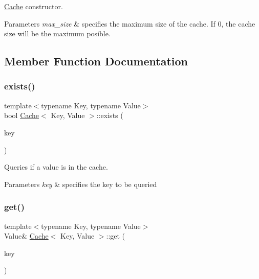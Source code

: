 \hyperlink{classCache}{Cache} constructor. 


\begin{DoxyParams}{Parameters}
{\em max\+\_\+size} & specifies the maximum size of the cache. If 0, the cache size will be the maximum posible. \\
\hline
\end{DoxyParams}


\subsection{Member Function Documentation}
\mbox{\label{classCache_a3cbee30a98148ba6e15e28e4e096d995}} 
\subsubsection{\texorpdfstring{exists()}{exists()}}
{\footnotesize\ttfamily template$<$typename Key, typename Value$>$ \\
bool \hyperlink{classCache}{Cache}$<$ Key, Value $>$\+::exists (\begin{DoxyParamCaption}\item[{const Key \&}]{key }\end{DoxyParamCaption})\hspace{0.3cm}{\ttfamily [inline]}}



Queries if a value is in the cache. 


\begin{DoxyParams}{Parameters}
{\em key} & specifies the key to be queried \\
\hline
\end{DoxyParams}
\mbox{\label{classCache_ae2c5a764bec9cf7bcc455d37377ff477}} 
\subsubsection{\texorpdfstring{get()}{get()}}
{\footnotesize\ttfamily template$<$typename Key, typename Value$>$ \\
Value\& \hyperlink{classCache}{Cache}$<$ Key, Value $>$\+::get (\begin{DoxyParamCaption}\item[{const Key \&}]{key }\end{DoxyParamCaption})\hspace{0.3cm}{\ttfamily [inline]}}



